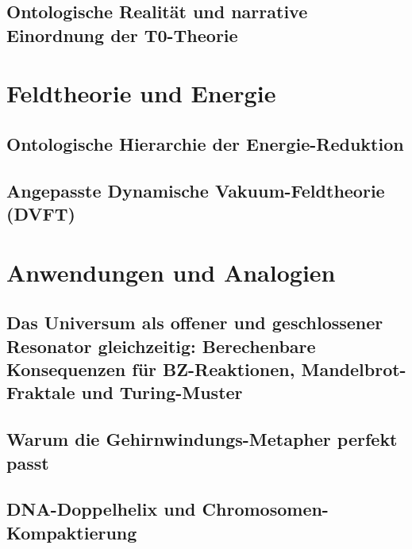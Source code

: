 \documentclass[11pt,oneside]{book}
\begin{document}
\chapter{Ontologische Realität und narrative Einordnung der T0-Theorie}


\part{Feldtheorie und Energie}

\chapter{Ontologische Hierarchie der Energie-Reduktion}


\chapter{Angepasste Dynamische Vakuum-Feldtheorie (DVFT)}


\part{Anwendungen und Analogien}

\chapter{Das Universum als offener und geschlossener Resonator gleichzeitig: Berechenbare Konsequenzen für BZ-Reaktionen, Mandelbrot-Fraktale und Turing-Muster}


\chapter{Warum die Gehirnwindungs-Metapher perfekt passt}


\chapter{DNA-Doppelhelix und Chromosomen-Kompaktierung}

\end{document}
